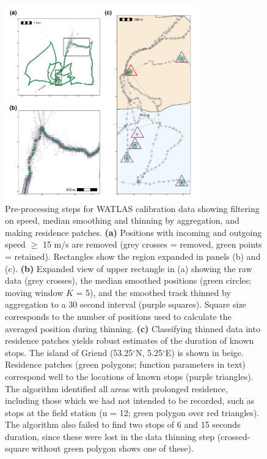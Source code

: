 \documentclass[10pt,paper=a4,headings=standardclasses
]{scrartcl}
\begin{document}
\begin{figure}[h!]
    \centering
    \includegraphics[width=0.75\textwidth]{figures/fig_06_calib_residence_patch.png}
    \caption{Pre-processing steps for WATLAS calibration data showing filtering on speed, median smoothing and thinning by aggregation, and making residence patches.
    \textbf{(a)} Positions with incoming and outgoing speed $\geq$ 15 m/s are removed (grey crosses = removed, green points = retained).
    Rectangles show the region expanded in panels (b) and (c).
    \textbf{(b)} Expanded view of upper rectangle in (a) showing the raw data (grey crosses), the median smoothed positions (green circles; moving window $K$ = 5), and the smoothed track thinned by aggregation to a 30 second interval (purple squares).
    Square size corresponds to the number of positions used to calculate the averaged position during thinning.
    \textbf{(c)} Classifying thinned data into residence patches yields robust estimates of the duration of known stops. The island of Griend (53.25$^{\circ}$N, 5.25$^{\circ}$E) is shown in beige.
    Residence patches (green polygons; function parameters in text) correspond well to the locations of known stops (purple triangles).
    The algorithm identified all areas with prolonged residence, including those which we had not intended to be recorded, such as stops at the field station (n = 12; green polygon over red triangles).
    The algorithm also failed to find two stops of 6 and 15 seconds duration, since these were lost in the data thinning step (crossed-square without green polygon shows one of these).}
    \label{fig:figure_calibration}
\end{figure}
\end{document}
